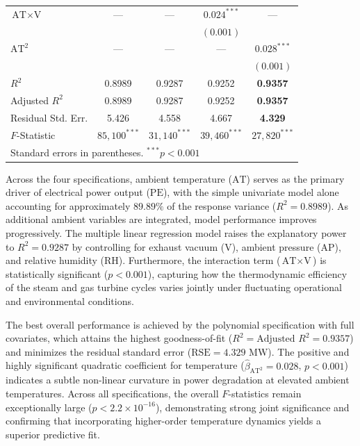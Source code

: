 \documentclass[11pt, letterpaper]{article}
\begin{document}
\begin{table}[htbp]
\begin{tabular}{lcccc}
        $\text{AT} \times \text{V}$ & ---    & ---             & $0.024^{***}$   & ---             \\
                           &                 &                 & $(0.001)$       &                 \\[3pt]
        $\text{AT}^2$      & ---             & ---             & ---             & $0.028^{***}$   \\
                           &                 &                 &                 & $(0.001)$       \\
        \midrule
        $R^2$              & 0.8989          & 0.9287          & 0.9252          & \textbf{0.9357} \\
        Adjusted $R^2$     & 0.8989          & 0.9287          & 0.9252          & \textbf{0.9357} \\
        Residual Std. Err. & 5.426           & 4.558           & 4.667           & \textbf{4.329}  \\
        $F$-Statistic      & $85{,}100^{***}$& $31{,}140^{***}$& $39{,}460^{***}$& $27{,}820^{***}$\\
        \bottomrule
        \multicolumn{5}{l}{\footnotesize Standard errors in parentheses. $^{***}p < 0.001$}
    \end{tabular}
\end{table}

Across the four specifications, ambient temperature (${\text{AT}}$) serves as the primary driver of electrical power output (${\text{PE}}$), with the simple univariate model alone accounting for approximately $89.89\%$ of the response variance ($R^2 = 0.8989$). As additional ambient variables are integrated, model performance improves progressively. The multiple linear regression model raises the explanatory power to $R^2 = 0.9287$ by controlling for exhaust vacuum (${\text{V}}$), ambient pressure (${\text{AP}}$), and relative humidity (${\text{RH}}$). Furthermore, the interaction term (${\text{AT}} \times {\text{V}}$) is statistically significant ($p < 0.001$), capturing how the thermodynamic efficiency of the steam and gas turbine cycles varies jointly under fluctuating operational and environmental conditions.

The best overall performance is achieved by the polynomial specification with full covariates, which attains the highest goodness-of-fit ($R^2 = \text{Adjusted } R^2 = 0.9357$) and minimizes the residual standard error ($\text{RSE} = 4.329\text{ MW}$). The positive and highly significant quadratic coefficient for temperature ($\hat{\beta}_{\text{AT}^2} = 0.028$, $p < 0.001$) indicates a subtle non-linear curvature in power degradation at elevated ambient temperatures. Across all specifications, the overall $F$-statistics remain exceptionally large ($p < 2.2 \times 10^{-16}$), demonstrating strong joint significance and confirming that incorporating higher-order temperature dynamics yields a superior predictive fit.
\end{document}
